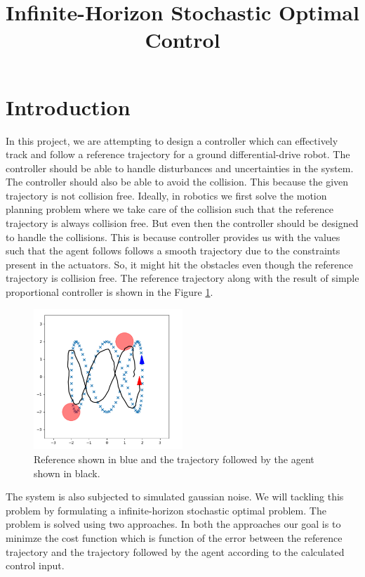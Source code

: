 \documentclass[conference]{IEEEtran}
\begin{document}
\title{Infinite-Horizon Stochastic Optimal Control\\
}

\author{
}

\maketitle



\section{Introduction} \label{sec:intro}
In this project, we are attempting to design a controller which can effectively track and follow a reference trajectory for a ground differential-drive robot.
The controller should be able to handle disturbances and uncertainties in the system. The controller should also be able to avoid the collision.
This because the given trajectory is not collision free. Ideally, in robotics we first solve the motion planning problem where we take care of the collision
such that the reference trajectory is always collision free. But even then the controller should be designed to handle the collisions. 
This is because controller provides us with the values such that the agent follows follows a smooth trajectory due to the 
constraints present in the actuators. So, it might hit the obstacles even though the reference trajectory is collision free.
The reference trajectory along with the result of simple proportional controller is shown in the Figure \ref{fig:reference_trajectory}.
\begin{figure}[h]
    \centering
    \includegraphics[width=0.5\textwidth]{intro.png}
    \caption{Reference shown in blue and the trajectory followed by the agent shown in black.}
    \label{fig:reference_trajectory}
\end{figure}
The system is also subjected to simulated gaussian noise. We will tackling this problem by formulating a
infinite-horizon stochastic optimal problem. The problem is solved using two approaches. In both the approaches our goal is to minimze the 
cost function which is function of the error between the reference trajectory and the trajectory followed by the agent according to the calculated control input.
\end{document}
